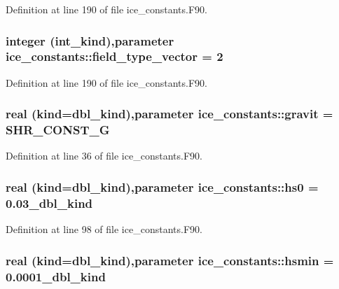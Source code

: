 Definition at line 190 of file ice\_\-constants.F90.\hypertarget{namespaceice__constants_abd07ef2bb17edc4fea6e1fc901ab89f8}{
\subsubsection[{field\_\-type\_\-vector}]{\setlength{\rightskip}{0pt plus 5cm}integer (int\_\-kind),parameter {\bf ice\_\-constants::field\_\-type\_\-vector} = 2}}
\label{namespaceice__constants_abd07ef2bb17edc4fea6e1fc901ab89f8}


Definition at line 190 of file ice\_\-constants.F90.\hypertarget{namespaceice__constants_ab875779750d9ad8407a02a9ec6bd8bda}{
\subsubsection[{gravit}]{\setlength{\rightskip}{0pt plus 5cm}real (kind=dbl\_\-kind),parameter {\bf ice\_\-constants::gravit} = SHR\_\-CONST\_\-G}}
\label{namespaceice__constants_ab875779750d9ad8407a02a9ec6bd8bda}


Definition at line 36 of file ice\_\-constants.F90.\hypertarget{namespaceice__constants_afb193f4389586bacd30b4382b1ca21c5}{
\subsubsection[{hs0}]{\setlength{\rightskip}{0pt plus 5cm}real (kind=dbl\_\-kind),parameter {\bf ice\_\-constants::hs0} = 0.03\_\-dbl\_\-kind}}
\label{namespaceice__constants_afb193f4389586bacd30b4382b1ca21c5}


Definition at line 98 of file ice\_\-constants.F90.\hypertarget{namespaceice__constants_aabb18cc60f80f91072acd8182b2776af}{
\subsubsection[{hsmin}]{\setlength{\rightskip}{0pt plus 5cm}real (kind=dbl\_\-kind),parameter {\bf ice\_\-constants::hsmin} = 0.0001\_\-dbl\_\-kind}}
\label{namespaceice__constants_aabb18cc60f80f91072acd8182b2776af}


